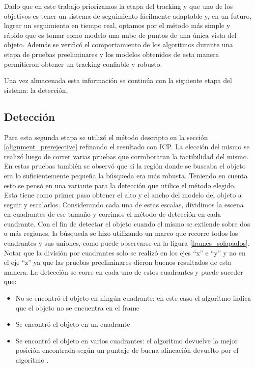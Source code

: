 Dado que en este trabajo priorizamos la etapa del tracking y que uno de los objetivos es tener un sistema de seguimiento fácilmente adaptable y, en un futuro, lograr un seguimiento en tiempo real, optamos por el método más simple y rápido que es tomar como modelo una nube de puntos de una única vista del objeto. Además se verificó el comportamiento de los algoritmos durante una etapa de pruebas preeliminares y los modelos obtenidos de esta manera permitieron obtener un tracking confiable y robusto.

Una vez almacenada esta información se continúa con la siguiente etapa del sistema: la detección.


\subsection{Detección}\label{deteccion_d}
Para esta segunda etapa se utilizó el método descripto en la sección \ref{alignment_prerejective} refinando el resultado con ICP. La elección del mismo se realizó luego de correr varias pruebas que corroboraran la factibilidad del mismo. En estas pruebas también se observó que si la región donde se buscaba el objeto era lo suficientemente pequeña la búsqueda era más robusta. Teniendo en cuenta esto se pensó en una variante para la detección que utilice el método elegido. Esta tiene como primer paso obtener el alto y el ancho del modelo del objeto a seguir y escalarlos. Considerando cada una de estas escalas, dividimos la escena en cuadrantes de ese tamaño y corrimos el método de detección en cada cuadrante. Con el fin de detectar el objeto cuando el mismo se extiende sobre dos o más regiones, la búsqueda se hizo utilizando un marco que recorre todos los cuadrantes y sus uniones, como puede observarse en la figura \ref{frames_solapados}. Notar que la división por cuadrantes solo se realizó en los ejes ``x'' e ``y'' y no en el eje ``z'' ya que las pruebas preeliminares dieron buenos resultados de esta manera. La detección se corre en cada uno de estos cuadrantes y puede suceder que:
\begin{itemize}
	\item No se encontró el objeto en ningún cuadrante: en este caso el algoritmo indica que el objeto no se encuentra en el frame
	\item Se encontró el objeto en un cuadrante
	\item Se encontró el objeto en varios cuadrantes: el algoritmo devuelve la mejor posición encontrada según un puntaje de buena alineación devuelto por el algoritmo \ap.
\end{itemize}

